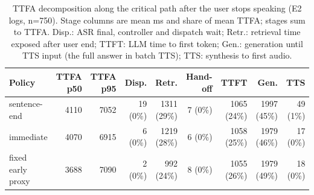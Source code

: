 \begin{table}[t]
\centering
\small
\caption{TTFA decomposition along the critical path after the user stops speaking (E2 logs, n=750). Stage columns are mean ms and share of mean TTFA; stages sum to TTFA. Disp.: ASR final, controller and dispatch wait; Retr.: retrieval time exposed after user end; TTFT: LLM time to first token; Gen.: generation until TTS input (the full answer in batch TTS); TTS: synthesis to first audio.}
\label{tab:latency_breakdown_e2}
\begin{tabular}{lrrrrrrrr}
\toprule
Policy & TTFA p50 & TTFA p95 & Disp. & Retr. & Hand-off & TTFT & Gen. & TTS \\
\midrule
sentence-end & 4110 & 7052 & 19 (0\%) & 1311 (29\%) & 7 (0\%) & 1065 (24\%) & 1997 (45\%) & 49 (1\%) \\
immediate & 4070 & 6915 & 6 (0\%) & 1219 (28\%) & 6 (0\%) & 1058 (25\%) & 1979 (46\%) & 17 (0\%) \\
fixed early proxy & 3688 & 7090 & 2 (0\%) & 992 (24\%) & 8 (0\%) & 1055 (26\%) & 1979 (49\%) & 18 (0\%) \\
\bottomrule
\end{tabular}
\end{table}
